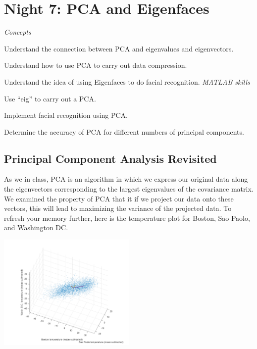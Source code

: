 \chapter{Night 7: PCA and Eigenfaces}

\begin{learningobjectives}
\emph{Concepts}
\bi
\item Understand the connection between PCA and eigenvalues and eigenvectors.
\item Understand how to use PCA to carry out data compression.
\item Understand the idea of using Eigenfaces to do facial recognition.
\ei
\emph{MATLAB skills}
\bi
\item Use ``eig'' to carry out a PCA.
\item Implement facial recognition using PCA.
\item Determine the accuracy of PCA for different numbers of principal components.
\ei
\end{learningobjectives}

\section{Principal Component Analysis Revisited}

As we in class, PCA is an algorithm in which we express our original data along the eigenvectors corresponding to the largest eigenvalues of the covariance matrix.  We examined the property of PCA that it if we project our data onto these vectors, this will lead to maximizing the variance of the projected data.  To refresh your memory further, here is the temperature plot for Boston, Sao Paolo, and Washington DC.

\begin{center}
\includegraphics[width=0.5\textwidth]{FacesNight6/figs/tempplot.png}
\label{temps}
\end{center}

